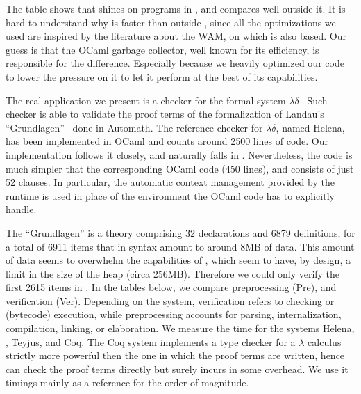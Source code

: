 \documentclass{llncs}
\begin{document}
The table shows that \elpi{} shines on programs in \rff{}, and compares well
outside it.  It is hard to understand why \elpi{} is faster than \tedius{}
outside \rff{}, since all the optimizations we used are inspired by the
literature about the WAM, on which \tedius{} is also based.  Our guess is that
the OCaml garbage collector, well known for its efficiency, is responsible for
the difference. Especially because we heavily optimized our code to lower the
pressure on it to let it perform at the best of its
capabilities.

The real application we present is a checker for the formal system
$\lambda\delta$~\cite{lambdadeltaJ1,lambdadeltaJ3a} Such
checker is able to validate the proof terms of the formalization of Landau's
``Grundlagen''~\cite{Jut79} done in Automath.  The reference checker for
$\lambda\delta$, named Helena, has been implemented in OCaml and counts around
2500 lines of code.  Our \lp{} implementation follows it closely, and
naturally falls in \rff{}.
Nevertheless, the \lp{} code is much simpler that the corresponding OCaml code
(450 lines), and consists of just 52 clauses.  In particular, the automatic
context management provided by the \lp{} runtime is used in place of the
environment the OCaml code has to explicitly handle. 

The ``Grundlagen'' is a theory comprising 32 declarations and 6879
definitions, for a total of 6911 items that in \lp{} syntax amount to around
8MB of data.  This amount of data seems to overwhelm the capabilities of
\tedius{}, which seem to have, by design, a limit in the size of the heap
(circa 256MB).  Therefore we could only verify the first 2615 items in
\tedius{}.  In the tables below, we compare preprocessing (Pre), and
verification (Ver).  Depending on the system, verification refers to checking
or (bytecode) execution, while preprocessing accounts for parsing,
internalization, compilation, linking, or elaboration.  We measure the time
for the systems Helena, \elpi, Teyjus, and Coq.  The Coq system implements a
type checker for a $\lambda$ calculus strictly more powerful then the one in
which the proof terms are written, hence can check the proof terms directly
but surely incurs in some overhead.  We use it timings mainly as a reference
for the order of magnitude.
\end{document}
